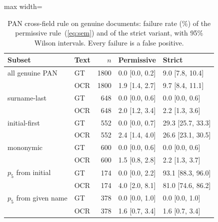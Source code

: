 \documentclass[12pt]{article}
\begin{document}
\clearpage
\begin{table}[H]
\caption{PAN cross-field rule on genuine documents: failure rate (\%)
of the permissive rule~(\ref{eq:sem}) and of the strict variant, with
95\% Wilson intervals. Every failure is a false positive.}
\label{tab:permstrict}
\centering
\scriptsize
\setlength{\tabcolsep}{3.5pt}
\renewcommand{\arraystretch}{1.05}
\begin{adjustbox}{max width=\linewidth}
\begin{tabular}{@{}llrll@{}}
\toprule
Subset & Text & $n$ & Permissive & Strict \\
\midrule
all genuine PAN & GT & 1800 & 0.0 [0.0, 0.2] & 9.0 [7.8, 10.4] \\
 & OCR & 1800 & 1.9 [1.4, 2.7] & 9.7 [8.4, 11.1] \\
\addlinespace[1.5pt]
surname-last & GT & 648 & 0.0 [0.0, 0.6] & 0.0 [0.0, 0.6] \\
 & OCR & 648 & 2.0 [1.2, 3.4] & 2.2 [1.3, 3.6] \\
\addlinespace[1.5pt]
initial-first & GT & 552 & 0.0 [0.0, 0.7] & 29.3 [25.7, 33.3] \\
 & OCR & 552 & 2.4 [1.4, 4.0] & 26.6 [23.1, 30.5] \\
\addlinespace[1.5pt]
mononymic & GT & 600 & 0.0 [0.0, 0.6] & 0.0 [0.0, 0.6] \\
 & OCR & 600 & 1.5 [0.8, 2.8] & 2.2 [1.3, 3.7] \\
\addlinespace[1.5pt]
$p_5$ from initial & GT & 174 & 0.0 [0.0, 2.2] & 93.1 [88.3, 96.0] \\
 & OCR & 174 & 4.0 [2.0, 8.1] & 81.0 [74.6, 86.2] \\
\addlinespace[1.5pt]
$p_5$ from given name & GT & 378 & 0.0 [0.0, 1.0] & 0.0 [0.0, 1.0] \\
 & OCR & 378 & 1.6 [0.7, 3.4] & 1.6 [0.7, 3.4] \\
\bottomrule
\end{tabular}
\end{adjustbox}
\end{table}
\clearpage
\end{document}
